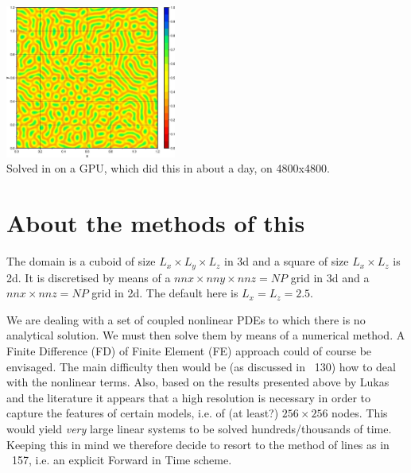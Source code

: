 \begin{center}
\includegraphics[width=5.6cm]{python_codes/fieldstone_171/images/uu000020.jpg}\\
{\captionfont Solved in on a GPU, which did this in about a day, on 4800x4800.}
\end{center}




\section*{About the methods of this \stone}

The domain is a cuboid of size $L_x \times L_y \times L_z$ in 3d and 
a square of size $L_x \times L_z$ is 2d.
It is discretised by means of a $nnx \times nny \times nnz = NP$ grid
in 3d and a $nnx \times nnz = NP$ grid in 2d.
The default here is $L_x=L_z=2.5$.

We are dealing with a set of coupled nonlinear PDEs to which there is no analytical solution.
We must then solve them by means of a numerical method. 
A Finite Difference (FD) of Finite Element (FE) approach could of course be envisaged. 
The main difficulty then would be (as discussed in \stone~130) how to deal with the 
nonlinear terms. Also, based on 
the results presented above by Lukas and the literature 
it appears that a high resolution is necessary in order
to capture the features of certain models, i.e. of (at least?) $256\times 256$ nodes. 
This would yield {\it very} large linear systems to be solved hundreds/thousands of time.
Keeping this in mind we therefore decide to resort to the method of lines as in \stone~157,
i.e. an explicit Forward in Time scheme.

